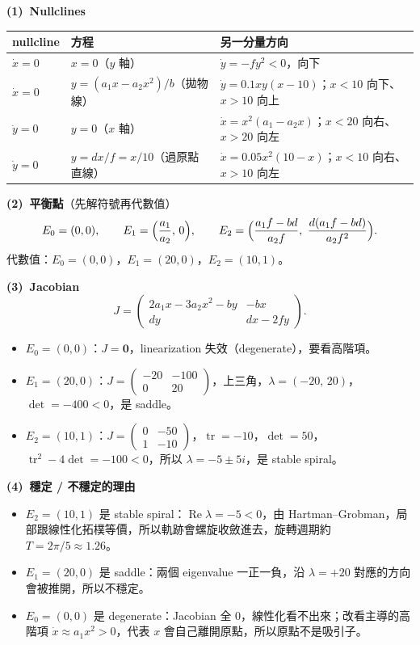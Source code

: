 \documentclass[11pt]{article}
\begin{document}
\medskip
\textbf{(1)\ Nullclines}

\begin{center}\small
\begin{tabular}{l l l}
\toprule
nullcline & 方程 & 另一分量方向\\
\midrule
$\dot x=0$ & $x=0$（$y$ 軸） & $\dot y=-fy^{2}<0$，向下\\
$\dot x=0$ & $y=(a_1 x-a_2 x^{2})/b$（拋物線） & $\dot y=0.1xy(x-10)$；$x<10$ 向下、$x>10$ 向上\\
$\dot y=0$ & $y=0$（$x$ 軸） & $\dot x=x^{2}(a_1-a_2 x)$；$x<20$ 向右、$x>20$ 向左\\
$\dot y=0$ & $y=dx/f=x/10$（過原點直線） & $\dot x=0.05x^{2}(10-x)$；$x<10$ 向右、$x>10$ 向左\\
\bottomrule
\end{tabular}
\end{center}

\medskip
\textbf{(2)\ 平衡點}（先解符號再代數值）
\[
  E_0=(0,0),\qquad E_1=\Bigl(\frac{a_1}{a_2},\,0\Bigr),\qquad
  E_2=\Bigl(\frac{a_1 f-bd}{a_2 f},\ \frac{d(a_1 f-bd)}{a_2 f^{2}}\Bigr).
\]
代數值：$E_0=(0,0)$，$E_1=(20,0)$，$E_2=(10,1)$。

\medskip
\textbf{(3)\ Jacobian}
\[
  J=\begin{pmatrix} 2a_1 x-3a_2 x^{2}-by & -bx\\[2pt] dy & dx-2fy\end{pmatrix}.
\]
\begin{itemize}\setlength{\itemsep}{2pt}
  \item $E_0=(0,0)$：$J=\mathbf 0$，linearization 失效（degenerate），要看高階項。
  \item $E_1=(20,0)$：$J=\begin{pmatrix}-20 & -100\\ 0 & 20\end{pmatrix}$，上三角，$\lambda=(-20,\,20)$，$\det=-400<0$，是 saddle。
  \item $E_2=(10,1)$：$J=\begin{pmatrix}0 & -50\\ 1 & -10\end{pmatrix}$，$\operatorname{tr}=-10$，$\det=50$，$\operatorname{tr}^{2}-4\det=-100<0$，所以 $\lambda=-5\pm5i$，是 stable spiral。
\end{itemize}

\medskip
\textbf{(4)\ 穩定 / 不穩定的理由}
\begin{itemize}\setlength{\itemsep}{2pt}
  \item $E_2=(10,1)$ 是 stable spiral：$\operatorname{Re}\lambda=-5<0$，由 Hartman--Grobman，局部跟線性化拓樸等價，所以軌跡會螺旋收斂進去，旋轉週期約 $T=2\pi/5\approx1.26$。
  \item $E_1=(20,0)$ 是 saddle：兩個 eigenvalue 一正一負，沿 $\lambda=+20$ 對應的方向會被推開，所以不穩定。
  \item $E_0=(0,0)$ 是 degenerate：Jacobian 全 0，線性化看不出來；改看主導的高階項 $\dot x\approx a_1 x^{2}>0$，代表 $x$ 會自己離開原點，所以原點不是吸引子。
\end{itemize}
\end{document}
